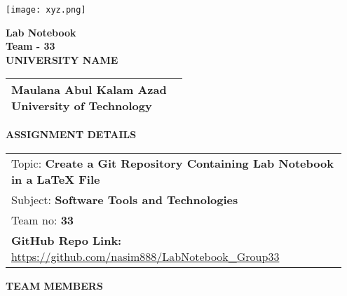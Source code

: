 \documentclass[a4paper,14pt]{article}
\begin{document}
\begin{center}
    \texttt{[image: xyz.png]} %
    \vspace{0.3cm}
\end{center}

\vspace{0.8cm}

\begin{center}
    {\LARGE \textbf{Lab Notebook}} \\
      \vspace{0.2cm}
    {\LARGE \textbf{Team - 33}} \\
    \vspace{0.50cm}
    \textbf{UNIVERSITY NAME} \\
    \vspace{0.20cm}
    \begin{tabular}{|p{0.50\linewidth}|}
    \hline
    Maulana Abul Kalam Azad University of Technology \\
    \hline
    \end{tabular}
    \vspace{0.50cm}
    
    \textbf{ASSIGNMENT DETAILS} \\
    \vspace{0.5cm}
    \begin{tabular}{|p{0.95\linewidth}|}
    \hline
     Topic: \textbf{Create a Git Repository Containing Lab Notebook in a LaTeX File} \\
     Subject: \textbf{Software Tools and Technologies} \\
     Team no: \textbf{33} \\
    \textbf{GitHub Repo Link:} \href{https://github.com/nasim888/LabNotebook_Group33}{https://github.com/nasim888/LabNotebook_Group33} \\
    \hline
    \end{tabular}
\end{center}

\vspace{1cm}

\begin{center}
    \textbf{TEAM MEMBERS}
\end{center}

\vspace{0.5cm}
\end{document}
